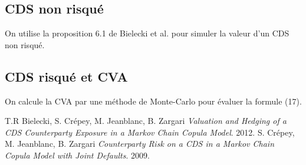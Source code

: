 \documentclass[a4paper]{article}
\theoremstyle{definition}
\theoremstyle{remark}
\begin{document}
\subsection{CDS non risqué}
On utilise la proposition 6.1 de Bielecki et al. \cite{A} pour simuler la valeur d'un CDS non risqué.
\subsection{CDS risqué et CVA}
On calcule la CVA par une méthode de Monte-Carlo pour évaluer la formule (17).

\begin{thebibliography}{9}
          T.R Bielecki, S. Crépey, M. Jeanblanc, B. Zargari
          \emph{Valuation and Hedging of a CDS Counterparty Exposure in a Markov Chain Copula Model}.
          2012.
          S. Crépey, M. Jeanblanc, B. Zargari
          \emph{Counterparty Risk on a CDS in a Markov Chain Copula Model with Joint Defaults}.
          2009.
\end{thebibliography}
\end{document}
